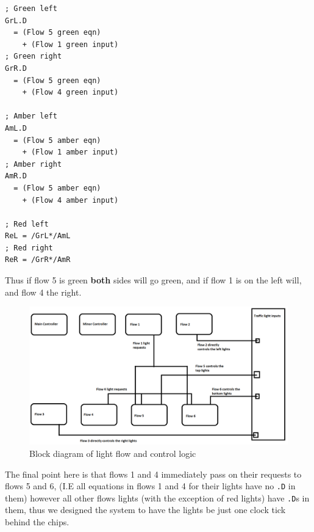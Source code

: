 \begin{lstlisting}[basicstyle=\ttfamily]
; Green left
GrL.D
  = (Flow 5 green eqn)
    + (Flow 1 green input)
; Green right
GrR.D
  = (Flow 5 green eqn)
    + (Flow 4 green input)

; Amber left
AmL.D
  = (Flow 5 amber eqn)
    + (Flow 1 amber input)
; Amber right
AmR.D
  = (Flow 5 amber eqn)
    + (Flow 4 amber input)

; Red left
ReL = /GrL*/AmL
; Red right 
ReR = /GrR*/AmR
\end{lstlisting}
Thus if flow 5 is green \textbf{both} sides will go green, and if flow 1 is on
the left will, and flow 4 the right.

\begin{figure}
\includegraphics[width=\linewidth]{img/5Hvmk3.png}
\caption{Block diagram of light flow and control logic}
\label{fig:TLFlowControl}
\end{figure}

The final point here is that flows 1 and 4 immediately pass on their requests to
flows 5 and 6, (I.E all equations in flows 1 and 4 for their lights have no
\texttt{.D} in them) however all other flows lights (with the exception of red
lights) have \texttt{.D}s in them, thus we designed the system to have the
lights be just one clock tick behind the chips. 